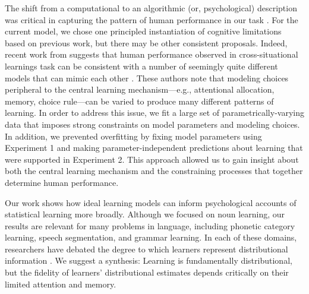 \documentclass{pnastwo}
\begin{document}
\begin{article}
The shift from a computational to an algorithmic (or, psychological) description was critical in capturing the pattern of human performance in our task \citep{Marr1982,Frank2010a,Yurovsky2012c}. For the current model, we chose one principled instantiation of cognitive limitations based on previous work, but there may be other consistent proposals. Indeed, recent work from \citep{Yu2012b} suggests that human performance observed in cross-situational learnings task can be consistent with a number of seemingly quite different models that can mimic each other \citep[see also,][]{Townsend1990}. These authors note that modeling choices peripheral to the central learning mechanism---e.g., attentional allocation, memory, choice rule---can be varied to produce many different patterns of learning. In order to address this issue, we fit a large set of parametrically-varying data that imposes strong constraints on model parameters and modeling choices. In addition, we prevented overfitting by fixing model parameters using Experiment 1 and making parameter-independent predictions about learning that were supported in Experiment 2. This approach allowed us to gain insight about both the central learning mechanism and the constraining processes that together determine human performance.

Our work shows how ideal learning models can inform psychological accounts of statistical learning more broadly. Although we focused on noun learning, our results are relevant for many problems in language, including phonetic category learning, speech segmentation, and grammar learning. In each of these domains, researchers have debated the degree to which learners represent distributional information \citep{Endress2005, Frank2010a, McMurray2013}. We suggest a synthesis: Learning is fundamentally distributional, but the fidelity of learners' distributional estimates depends critically on their limited attention and memory.
%
%

\begin{materials}


\end{materials}
\end{article}
\end{document}

